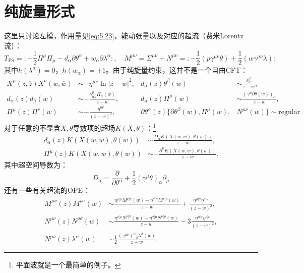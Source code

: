 \section{纯旋量形式}
这里只讨论左模，作用量见\ref{eq:5.23}，能动张量以及对应的超流（费米Lorentz流）：
\begin{equation}
	T_{\mathrm{PS}} = :-\frac{1}{2} \Pi^\mu \Pi_\mu - d_\alpha \partial \theta^\alpha + w_\alpha \partial \lambda^\alpha:, \quad M^{\mu\nu} = \Sigma^{\mu\nu} + N^{\mu\nu} = :-\frac{1}{2} (p \gamma^{\mu\nu} \theta) + \frac{1}{2} (w \gamma^{\mu\nu} \lambda):
\end{equation}
其中$h(\lambda^\alpha) = 0$，$h(w_\alpha) = +1$。由于纯旋量约束，这并不是一个自由CFT：
\begin{equation}
	\begin{aligned}
		X^\mu(z,\overline{z}) X^\nu(w,\overline{w}) 
		&\sim -\eta^{\mu\nu} \ln|z-w|^2, 
		& d_\alpha(z) \theta^\beta(w) 
		&\sim \frac{\delta_\alpha^\beta}{z-w}, \\
		d_\alpha(z) d_\beta(w) 
		&\sim -\frac{\gamma_{\alpha\beta}^\mu \Pi_\mu(w)}{z-w}, 
		& d_\alpha(z) \Pi^\mu(w) 
		&\sim \frac{(\gamma^\mu \partial\theta(w))_\alpha}{z-w}, \\
		\Pi^\mu(z) \Pi^\nu(w) 
		&\sim -\frac{\eta^{\mu\nu}}{(z-w)^2},&
		\partial\theta^\alpha(z) \{ \partial\theta^\beta(w),\Pi^\mu(w),&N^{\mu\nu}(w) \} \sim \mathrm{regular}
	\end{aligned}
\end{equation}
对于任意的不显含$X,\theta$导数项的超场$K(X,\theta)$：\footnote{平面波就是一个最简单的例子。}
\begin{equation}
	\begin{aligned}
		d_\alpha(z) K\left(X(w,\overline{w}), \theta(w)\right) 
		&\sim \frac{D_\alpha K\left(X(w,\overline{w}), \theta(w)\right)}{z-w}, \\
		\Pi^\mu(z) K\left(X(w,\overline{w}), \theta(w)\right) 
		&\sim -\frac{\partial^\mu K\left(X(w,\overline{w}), \theta(w)\right)}{z-w}.
	\end{aligned}
\end{equation}
其中超空间导数为：
\begin{equation}
	D_\alpha=\frac{\partial}{\partial\theta^\alpha}+\frac{1}{2}(\gamma^\mu\theta)_\alpha\partial_\mu
\end{equation}
还有一些有关超流的OPE：
\begin{equation}
	\begin{aligned}
		M^{\mu\nu}(z) M^{\rho\sigma}(w) 
		&\sim \frac{\eta^{\rho[\mu} M^{\nu]\sigma}(w) - \eta^{\sigma[\mu} M^{\nu]\rho}(w)}{z-w} + \frac{\eta^{\mu[\sigma} \eta^{\rho]\nu}}{(z-w)^2}, \\
		N^{\mu\nu}(z) N^{\rho\sigma}(w) 
		&\sim \frac{\eta^{\rho[\mu} N^{\nu]\sigma}(w) - \eta^{\sigma[\mu} N^{\nu]\rho}(w)}{z-w} - 3 \frac{\eta^{\mu[\sigma} \eta^{\rho]\nu}}{(z-w)^2}, \\
		N^{\mu\nu}(z) \lambda^\alpha(w) 
		&\sim \frac{1}{2} \frac{(\gamma^{\mu\nu})^\alpha{}_\beta \lambda^\beta(w)}{z-w}.
	\end{aligned}
\end{equation}